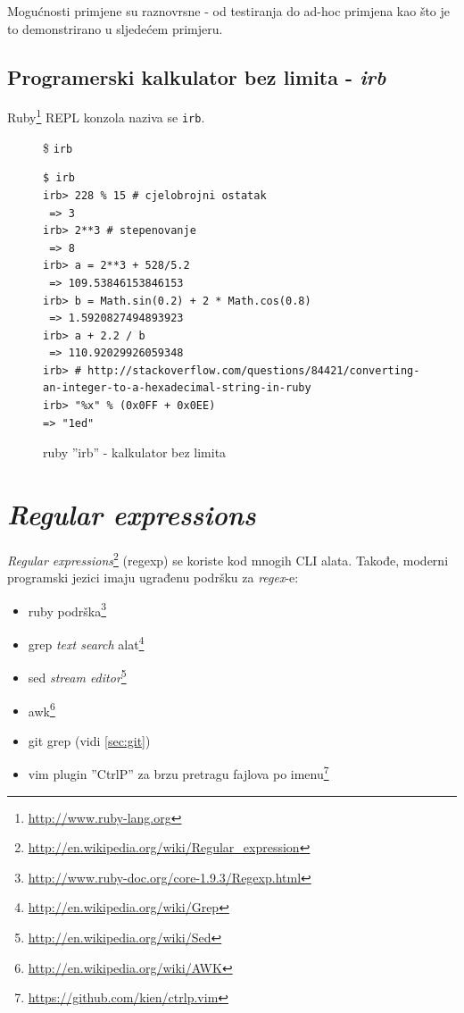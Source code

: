 \documentclass[times, utf8, seminar]{fit}
\begin{document}
Mogućnosti primjene su raznovrsne - od testiranja do ad-hoc primjena kao što je to demonstrirano u sljedećem primjeru.

\subsection{Programerski kalkulator bez limita - \emph{irb}}

Ruby\footnote{\url{http://www.ruby-lang.org}} REPL konzola naziva se \verb+irb+. 


\begin{figure}[H]
\$ \verb+irb+

\begin{lstlisting}
$ irb
irb> 228 % 15 # cjelobrojni ostatak
 => 3 
irb> 2**3 # stepenovanje
 => 8 
irb> a = 2**3 + 528/5.2
 => 109.53846153846153 
irb> b = Math.sin(0.2) + 2 * Math.cos(0.8)
 => 1.5920827494893923 
irb> a + 2.2 / b
 => 110.92029926059348
irb> # http://stackoverflow.com/questions/84421/converting-an-integer-to-a-hexadecimal-string-in-ruby
irb> "%x" % (0x0FF + 0x0EE) 
=> "1ed" 

\end{lstlisting}

\caption{ruby ''irb'' - kalkulator bez limita}
\end{figure}

\section{\emph{Regular expressions}}

\emph{Regular expressions}\footnote{\url{http://en.wikipedia.org/wiki/Regular_expression}} (regexp) se koriste kod mnogih CLI alata. Takođe, moderni programski jezici imaju ugrađenu podršku za \emph{regex}-e:
\begin{itemize}
   \item ruby podrška\footnote{\url{http://www.ruby-doc.org/core-1.9.3/Regexp.html}}
   \item grep \emph{text search} alat\footnote{\url{http://en.wikipedia.org/wiki/Grep}}
   \item sed \emph{stream editor}\footnote{\url{http://en.wikipedia.org/wiki/Sed}}
   \item awk\footnote{\url{http://en.wikipedia.org/wiki/AWK}}
   \item git grep (vidi \ref{sec:git})
   \item vim plugin ''CtrlP'' za brzu pretragu fajlova po imenu\footnote{\url{https://github.com/kien/ctrlp.vim}}
\end{itemize}
\end{document}
